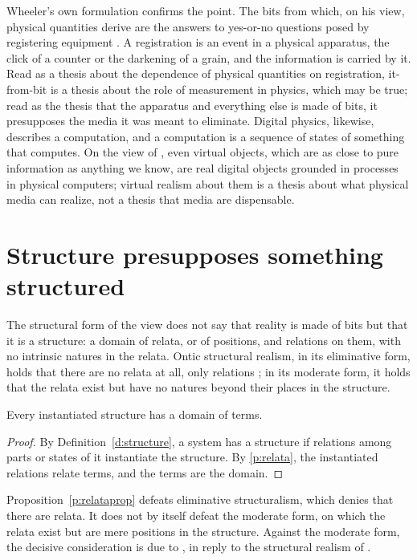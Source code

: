 \documentclass{situationist-preprint}
\begin{document}
Wheeler's own formulation confirms the point. The bits from which, on his view, physical quantities derive are the answers to yes-or-no questions posed by registering equipment \citep{Wheeler1990}. A registration is an event in a physical apparatus, the click of a counter or the darkening of a grain, and the information is carried by it. Read as a thesis about the dependence of physical quantities on registration, it-from-bit is a thesis about the role of measurement in physics, which may be true; read as the thesis that the apparatus and everything else is made of bits, it presupposes the media it was meant to eliminate. Digital physics, likewise, describes a computation, and a computation is a sequence of states of something that computes. On the view of \citet{Chalmers2022}, even virtual objects, which are as close to pure information as anything we know, are real digital objects grounded in processes in physical computers; virtual realism about them is a thesis about what physical media can realize, not a thesis that media are dispensable.

\section{Structure presupposes something structured}\label{s:structure}

The structural form of the view does not say that reality is made of bits but that it is a structure: a domain of relata, or of positions, and relations on them, with no intrinsic natures in the relata. Ontic structural realism, in its eliminative form, holds that there are no relata at all, only relations \citep{LadymanRoss2007}; in its moderate form, it holds that the relata exist but have no natures beyond their places in the structure.

\begin{proposition}[Relata]\label{p:relataprop}
Every instantiated structure has a domain of terms.
\end{proposition}

\begin{proof}
By Definition~\ref{d:structure}, a system has a structure if relations among parts or states of it instantiate the structure. By \ref{p:relata}, the instantiated relations relate terms, and the terms are the domain.
\end{proof}

Proposition~\ref{p:relataprop} defeats eliminative structuralism, which denies that there are relata. It does not by itself defeat the moderate form, on which the relata exist but are mere positions in the structure. Against the moderate form, the decisive consideration is due to \citet{Newman1928}, in reply to the structural realism of \citet{Russell1927}.
\end{document}
